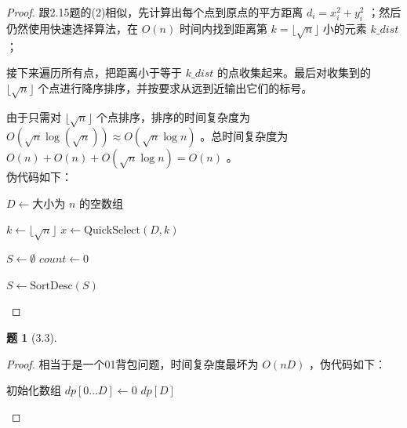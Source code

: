 \documentclass[11pt, a4paper]{article}
\newtheorem{problem}{题}
\begin{document}
\begin{proof}
    跟2.15题的(2)相似，先计算出每个点到原点的平方距离 $d_i = x_i^2 + y_i^2$ ；然后仍然使用快速选择算法，在 $O(n)$ 时间内找到距离第 $k = \lfloor\sqrt{n}\rfloor$ 小的元素 $k\_dist$ ；
    
    接下来遍历所有点，把距离小于等于 $k\_dist$ 的点收集起来。最后对收集到的 $\lfloor\sqrt{n}\rfloor$ 个点进行降序排序，并按要求从远到近输出它们的标号。
    
    由于只需对 $\lfloor\sqrt{n}\rfloor$ 个点排序，排序的时间复杂度为 $O(\sqrt{n}\log(\sqrt{n})) \approx O(\sqrt{n}\log n)$ 。总时间复杂度为 $O(n) + O(n) + O(\sqrt{n}\log n) = O(n)$ 。\\
    伪代码如下：
    
    \begin{algorithm}[H]
    \caption{找距离原点最近的 $\lfloor\sqrt{n}\rfloor$ 个点}
    
    $D \leftarrow \text{大小为 } n \text{ 的空数组}$\;
    
    $k \leftarrow \lfloor\sqrt{n}\rfloor$\;
    $x \leftarrow \text{QuickSelect}(D, k)$\; 
    
    $S \leftarrow \emptyset$\;
    $count \leftarrow 0$\;
    
    $S \leftarrow \text{SortDesc}(S)$\; 
    \end{algorithm}
\end{proof}

\begin{problem}[3.3]
\end{problem}

\begin{proof}
    相当于是一个01背包问题，时间复杂度最坏为 $O(nD)$ ，伪代码如下：

    \begin{algorithm}[H]
    \caption{货柜存储最大收益算法 (基于动态规划)}
    初始化数组 $dp[0 \dots D] \gets 0$\; 
    \Return $dp[D]$\;
    \end{algorithm}
\end{proof}
\end{document}
